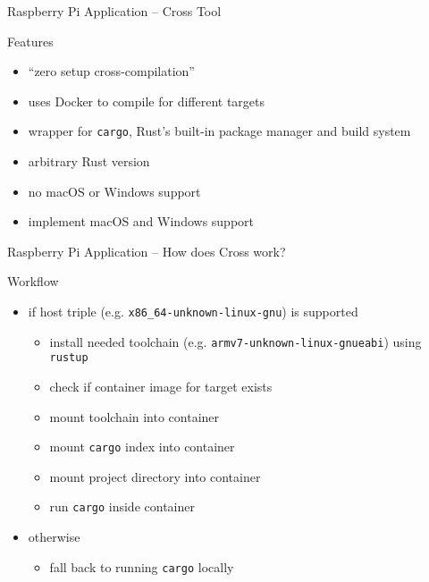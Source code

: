 \begin{frame}{Raspberry Pi Application -- Cross Tool}
  \begin{block}{Features}
    \begin{itemize}
      \item “zero setup cross-compilation”
      \item uses Docker to compile for different targets
      \item wrapper for \texttt{cargo}, Rust's built-in package manager and build system
      \item arbitrary Rust version
    \end{itemize}
  \end{block}

  \begin{block}{}
    \begin{itemize}
      \item no macOS or Windows support
    \end{itemize}
  \end{block}

  \begin{block}{}
    \begin{itemize}
      \item implement macOS and Windows support
    \end{itemize}
  \end{block}
\end{frame}

\begin{frame}{Raspberry Pi Application -- How does Cross work?}
  \begin{block}{Workflow}
     \begin{itemize}
       \item if host triple (e.g. \texttt{x86\_64-unknown-linux-gnu}) is supported
         \begin{itemize}
          \item install needed toolchain (e.g. \texttt{armv7-unknown-linux-gnueabi}) using \texttt{rustup}
          \item check if container image for target exists
          \item mount toolchain into container
          \item mount \texttt{cargo} index into container
          \item mount project directory into container
          \item run \texttt{cargo} inside container
         \end{itemize}
       \item otherwise
         \begin{itemize}
           \item fall back to running \texttt{cargo} locally
         \end{itemize}
    \end{itemize}
  \end{block}
\end{frame}

